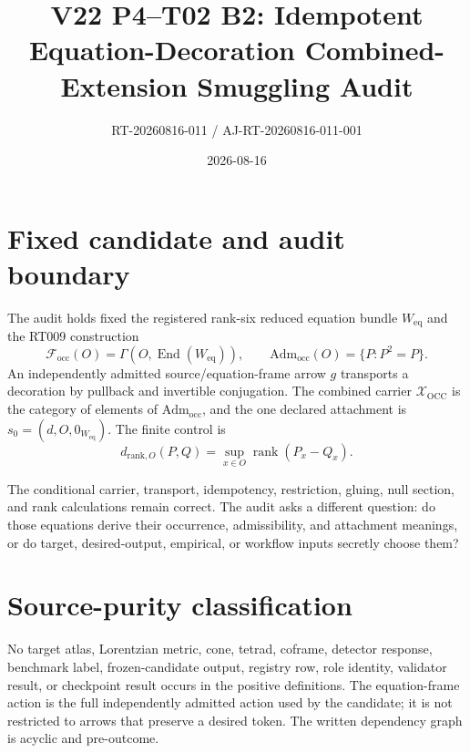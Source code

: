 \documentclass[11pt]{article}
\title{V22 P4--T02 B2: Idempotent Equation-Decoration Combined-Extension Smuggling Audit}
\author{RT-20260816-011 / AJ-RT-20260816-011-001}
\date{2026-08-16}
\newcommand{\Weq}{W_{\mathrm{eq}}}
\newcommand{\Focc}{\mathcal F_{\mathrm{occ}}}
\newcommand{\Adm}{\mathrm{Adm}_{\mathrm{occ}}}
\newcommand{\Xocc}{\mathcal X_{\mathrm{OCC}}}
\begin{document}
\maketitle

\begin{center}
\end{center}

\section{Fixed candidate and audit boundary}

The audit holds fixed the registered rank-six reduced equation bundle $\Weq$
and the RT009 construction
\[
 \Focc(O)=\Gamma(O,\operatorname{End}(\Weq)),\qquad
 \Adm(O)=\{P:P^2=P\}.
\]
An independently admitted source/equation-frame arrow $g$ transports a
decoration by pullback and invertible conjugation. The combined carrier
$\Xocc$ is the category of elements of $\Adm$, and the one declared attachment
is $s_0=(d,O,0_{\Weq})$. The finite control is
\[
 d_{\mathrm{rank},O}(P,Q)=\sup_{x\in O}\operatorname{rank}(P_x-Q_x).
\]

The conditional carrier, transport, idempotency, restriction, gluing, null
section, and rank calculations remain correct. The audit asks a different
question: do those equations derive their occurrence, admissibility, and
attachment meanings, or do target, desired-output, empirical, or workflow
inputs secretly choose them?

\section{Source-purity classification}

No target atlas, Lorentzian metric, cone, tetrad, coframe, detector response,
benchmark label, frozen-candidate output, registry row, role identity,
validator result, or checkpoint result occurs in the positive definitions.
The equation-frame action is the full independently admitted action used by
the candidate; it is not restricted to arrows that preserve a desired token.
The written dependency graph is acyclic and pre-outcome.
\end{document}
